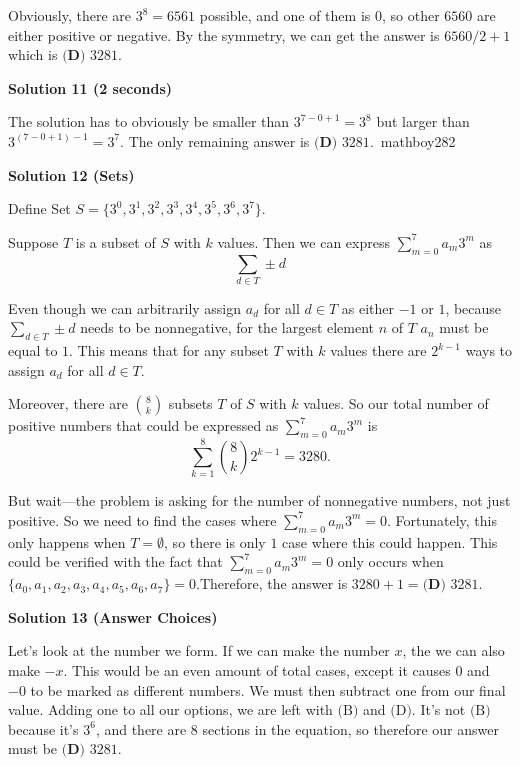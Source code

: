 \begin{enumerate}
Obviously, there are $3^8 = 6561$ possible, and one of them is 0, so other $6560$ are either positive or negative. By the symmetry, we can get the answer is $6560/2 + 1$ which is $\boxed{\textbf{(D) } 3281}$.

 



\textbf{Solution 11 (2 seconds)}

The solution has to obviously be smaller than $3^{7-0+1}=3^8$ but larger than $3^{(7-0+1)-1} = 3^7.$ The only remaining answer is $\boxed{\textbf{(D) } 3281}.$~mathboy282

 



\textbf{Solution 12 (Sets)}

Define Set $S=\{3^0, 3^1, 3^2, 3^3, 3^4, 3^5, 3^6, 3^7\}$.

 Suppose $T$ is a subset of $S$ with $k$ values. Then we can express $\sum_{m=0}^{7} a_m3^m$ as
 \[\sum_{d \in T} \pm d\]

 Even though we can arbitrarily assign $a_d$ for all $d \in T$ as either $-1$ or $1$, because $\sum_{d \in T} \pm d$ needs to be nonnegative, for the largest element $n$ of $T$ $a_n$ must be equal to $1$. This means that for any subset $T$ with $k$ values there are $2^{k-1}$ ways to assign $a_d$ for all $d \in T$.

 Moreover, there are $\binom{8}{k}$ subsets $T$ of $S$ with $k$ values. So our total number of positive numbers that could be expressed as $\sum_{m=0}^{7} a_m3^m$ is
 \[\sum_{k=1}^{8} \binom{8}{k}2^{k-1}=3280.\]

 But wait---the problem is asking for the number of nonnegative numbers, not just positive. So we need to find the cases where $\sum_{m=0}^{7} a_m3^m=0$. Fortunately, this only happens when $T=\emptyset$, so there is only $1$ case where this could happen. This could be verified with the fact that $\sum_{m=0}^{7} a_m3^m=0$ only occurs when $\{a_0, a_1, a_2, a_3, a_4, a_5, a_6, a_7\}=0$.Therefore, the answer is $3280+1=\boxed{\textbf{(D) }3281}$.

 



\textbf{Solution 13 (Answer Choices)}

Let's look at the number we form. If we can make the number $x$, the we can also make $-x$. This would be an even amount of total cases, except it causes $0$ and $-0$ to be marked as different numbers. We must then subtract one from our final value. Adding one to all our options, we are left with $\text{(B)}$ and $\text{(D)}$. It's not $\text{(B)}$ because it's $3^6$, and there are 8 sections in the equation, so therefore our answer must be $\boxed{\textbf{(D) }3281}$.


\end{enumerate}
